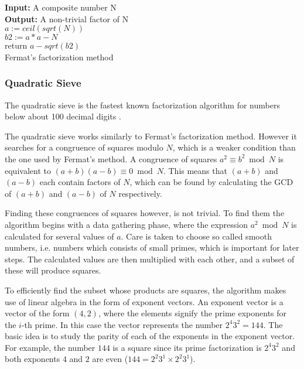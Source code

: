 \documentclass[paper=a4, fontsize=11pt,numbers=endperiod]{scrartcl} %
\numberwithin{equation}{section} %
\numberwithin{figure}{section} %
\numberwithin{table}{section} %
\begin{document}
\begin{algorithm}[H]
 \SetAlgoLined %
 \textbf{Input:} {A composite number N}\\
 \textbf{Output:} {A non-trivial factor of N}\\
 $a := ceil(sqrt(N))$\\
 $b2 := a*a - N$\\
  return $a-sqrt(b2)$\;
  \hspace{0pt}\\
  \caption{Fermat's factorization method \cite{fermat}}
\end{algorithm}

\subsubsection{Quadratic Sieve}
The quadratic sieve \cite{qsieve} is the fastest known factorization algorithm for numbers below about 100 decimal digits \cite{qsieve2}. 

The quadratic sieve works similarly to Fermat's factorization method.
However it searches for a congruence of squares modulo $N$, which is a weaker condition than the one used by Fermat's method.
A congruence of squares $a^2 \equiv b^2 \bmod N$ is equivalent to $(a+b)(a-b) \equiv 0 \bmod N$.
This means that $(a+b)$ and $(a-b)$ each contain factors of $N$, which can be found by calculating the GCD of $(a+b)$ and $(a-b)$ of $N$ respectively.

Finding these congruences of squares however, is not trivial.
To find them the algorithm begins with a data gathering phase, where the expression $a^2 \bmod N$ is calculated for several values of $a$.
Care is taken to choose so called smooth numbers, i.e. numbers which consists of small primes, which is important for later steps.
The calculated values are then multiplied with each other, and a subset of these will produce squares.

To efficiently find the subset whose products are squares, the algorithm makes use of linear algebra in the form of exponent vectors.
An exponent vector is a vector of the form $(4, 2)$, where the elements signify the prime exponents for the $i$-th prime.
In this case the vector represents the number $2^4 3^2 = 144$.
The basic idea is to study the parity of each of the exponents in the exponent vector.
For example, the number $144$ is a square since its prime factorization is $2^{4}3^2$ and both exponents $4$ and $2$ are even ($144 = 2^2 3^1\times2^2 3^1$).
\end{document}
